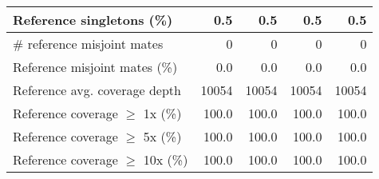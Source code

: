 \documentclass[12pt,a4paper]{article}
\begin{document}
\begin{table}[ht]
\begin{center}
\begin{tabular}{|l*{4}{|r}|}
Reference singletons (\%) & 0.5 & 0.5 & 0.5 & 0.5 \\ \hline
\# reference misjoint mates & 0 & 0 & 0 & 0 \\ \hline
Reference misjoint mates (\%) & 0.0 & 0.0 & 0.0 & 0.0 \\ \hline
Reference avg. coverage depth & 10054 & 10054 & 10054 & 10054 \\ \hline
Reference coverage $\geq$ 1x (\%) & 100.0 & 100.0 & 100.0 & 100.0 \\ \hline
Reference coverage $\geq$ 5x (\%) & 100.0 & 100.0 & 100.0 & 100.0 \\ \hline
Reference coverage $\geq$ 10x (\%) & 100.0 & 100.0 & 100.0 & 100.0 \\ \hline
\end{tabular}
\end{center}
\end{table}
\end{document}
